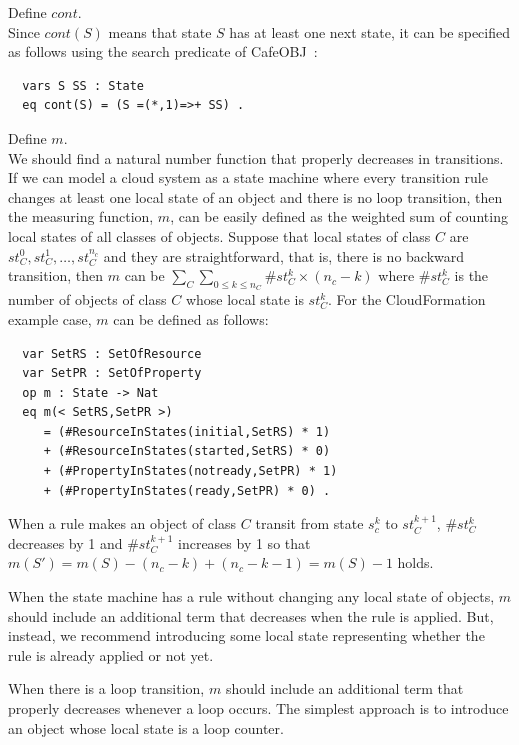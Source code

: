 \documentclass[12pt]{report}
\newcommand{\cafeobj}{{\sf CafeOBJ}~}
\begin{document}
 Define $cont$. \\ Since $cont(S)$ means that
state $S$ has at least one next state, it can be specified as follows
using the search predicate of \cafeobj:
\begin{verbatim}
  vars S SS : State
  eq cont(S) = (S =(*,1)=>+ SS) .
\end{verbatim}
 Define $m$. \\ We should find a natural
number function that properly decreases in transitions. If we can
model a cloud system as a state machine where every transition rule
changes at least one local state of an object and there is no loop
transition, then the measuring function, $m$, can be easily defined as
the weighted sum of counting local states of all classes of objects.
Suppose that local states of class $C$ are $st_C^0, st_C^1, \dots ,
st_C^{n_c}$ and they are straightforward, that is, there is no
backward transition, then $m$ can be $\sum_{C} \sum_{0 \le k \le n_C}
\#st_C^k \times (n_c - k)$ where $\#st_C^k$ is the number of objects
of class $C$ whose local state is $st_C^k$. For the CloudFormation
example case, $m$ can be defined as follows:
\begin{verbatim}
  var SetRS : SetOfResource
  var SetPR : SetOfProperty
  op m : State -> Nat
  eq m(< SetRS,SetPR >)
     = (#ResourceInStates(initial,SetRS) * 1) 
     + (#ResourceInStates(started,SetRS) * 0)
     + (#PropertyInStates(notready,SetPR) * 1) 
     + (#PropertyInStates(ready,SetPR) * 0) .
\end{verbatim}
When a rule makes an object of class $C$ transit from state $s_c^k$ to
$st_C^{k+1}$, $\#st_C^k$ decreases by 1 and $\#st_C^{k+1}$ increases by 1 so that
$m(S')=m(S)-(n_c-k)+(n_c-k-1)=m(S)-1$ holds.

When the state machine has a rule without changing any local state
of objects, $m$ should include an additional term that decreases when
the rule is applied. But, instead, we recommend introducing some local
state representing whether the rule is already applied or not yet.

When there is a loop transition, $m$ should include an additional term
that properly decreases whenever a loop occurs. The simplest approach
is to introduce an object whose local state is a loop counter.\\
\end{document}
